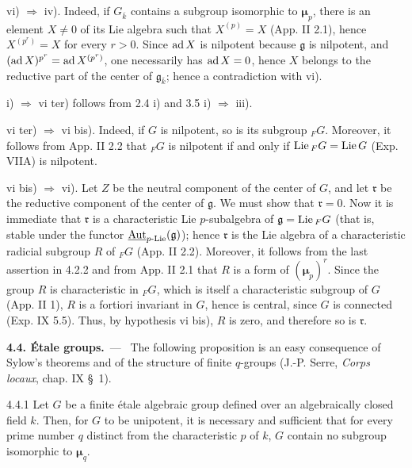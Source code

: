 \noindent vi) $\Rightarrow$ iv). Indeed, if $G_{\overline k}$ contains a subgroup isomorphic to $\boldsymbol\mu_p$, there is an element $X\neq0$ of its Lie algebra such that $X^{(p)}=X$ (App. II 2.1), hence $X^{(p^r)}=X$ for every $r>0$. Since $\operatorname{ad} X$ is nilpotent because $\mathfrak g$ is nilpotent, and $(\operatorname{ad} X)^{p^r}=\operatorname{ad} X^{(p^r)}$, one necessarily has $\operatorname{ad} X=0$, hence $X$ belongs to the reductive part of the center of $\mathfrak g_{\overline k}$; hence a contradiction with vi).

\noindent i) $\Rightarrow$ vi ter) follows from 2.4 i) and 3.5 i) $\Rightarrow$ iii).

\noindent vi ter) $\Rightarrow$ vi bis). Indeed, if $G$ is nilpotent, so is its subgroup ${}_F G$. Moreover, it follows from App. II 2.2 that ${}_F G$ is nilpotent if and only if $\operatorname{Lie}{}_F G=\operatorname{Lie} G$ (Exp. VIIA) is nilpotent.

\noindent vi bis) $\Rightarrow$ vi). Let $Z$ be the neutral component of the center of $G$, and let $\mathfrak r$ be the reductive component of the center of $\mathfrak g$. We must show that $\mathfrak r=0$. Now it is immediate that $\mathfrak r$ is a characteristic Lie $p$-subalgebra of $\mathfrak g=\operatorname{Lie}{}_F G$ (that is, stable under the functor $\underline{\operatorname{Aut}}_{p\text{-Lie}}(\mathfrak g)$); hence $\mathfrak r$ is the Lie algebra of a characteristic radicial subgroup $R$ of ${}_F G$ (App. II 2.2). Moreover, it follows from the last assertion in 4.2.2 and from App. II 2.1 that $R$ is a form of $(\boldsymbol\mu_p)^r$. Since the group $R$ is characteristic in ${}_F G$, which is itself a characteristic subgroup of $G$ (App. II 1), $R$ is a fortiori invariant in $G$, hence is central, since $G$ is connected (Exp. IX 5.5). Thus, by hypothesis vi bis), $R$ is zero, and therefore so is $\mathfrak r$.

\par\medskip\noindent\textbf{4.4. Étale groups.}\ ---\ \label{XVII.4.4}
The following proposition is an easy consequence of Sylow's theorems and of the structure of finite $q$-groups (\cf J.-P. Serre, \emph{Corps locaux}, chap. IX \S~1).
\begin{proposition}{4.4.1}\label{XVII.4.4.1}
Let $G$ be a finite étale algebraic group defined over an algebraically closed field $k$. Then, for $G$ to be unipotent, it is necessary and sufficient that for every prime number $q$ distinct from the characteristic $p$ of $k$, $G$ contain no subgroup isomorphic to $\boldsymbol\mu_q$.
\end{proposition}

